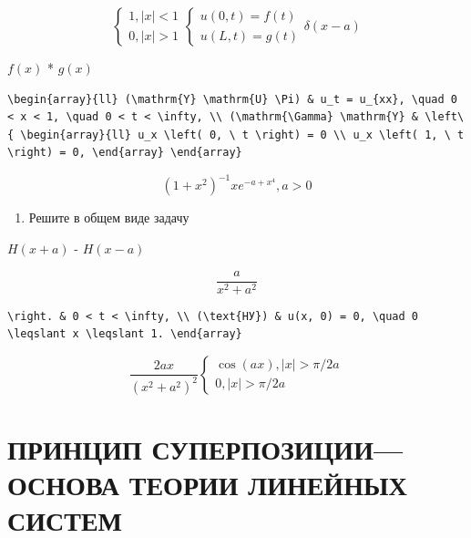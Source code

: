 \documentclass[
  ukrainian,
]{article}
\providecommand{\tightlist}{%
  \setlength{\itemsep}{0pt}\setlength{\parskip}{0pt}}
\begin{document}
\[
\begin{cases} 1, |x| < 1 \\ 0, |x| > 1 \end{cases}
\begin{cases} u(0, t) = f(t) \\ u(L, t) = g(t) \end{cases}
\delta(x-a)
\]

\(f(x)\) * \(g(x)\)

\begin{verbatim}
\begin{array}{ll} (\mathrm{Y} \mathrm{U} \Pi) & u_t = u_{xx}, \quad 0 < x < 1, \quad 0 < t < \infty, \\ (\mathrm{\Gamma} \mathrm{Y} & \left\{ \begin{array}{ll} u_x \left( 0, \ t \right) = 0 \\ u_x \left( 1, \ t \right) = 0, \end{array} \end{array}
\end{verbatim}

\[
(1+x^2)^{-1}
xe^{-a+x^4}, a > 0
\]

\begin{enumerate}
\def\labelenumi{\arabic{enumi}.}
\setcounter{enumi}{1}
\tightlist
\item
  Решите в общем виде задачу
\end{enumerate}

\(H(x+a)\) - \(H(x-a)\)

\[
\frac{a}{x^2+a^2}
\]

\begin{verbatim}
\right. & 0 < t < \infty, \\ (\text{НУ}) & u(x, 0) = 0, \quad 0 \leqslant x \leqslant 1. \end{array}
\end{verbatim}

\[
\frac{2ax}{(x^2+a^2)^2}
\begin{cases} \cos(ax), |x| > \pi/2a \\ 0, |x| > \pi/2a \end{cases}
\]

\section{ПРИНЦИП СУПЕРПОЗИЦИИ--- ОСНОВА ТЕОРИИ ЛИНЕЙНЫХ
СИСТЕМ}\label{ux43fux440ux438ux43dux446ux438ux43f-ux441ux443ux43fux435ux440ux43fux43eux437ux438ux446ux438ux438-ux43eux441ux43dux43eux432ux430-ux442ux435ux43eux440ux438ux438-ux43bux438ux43dux435ux439ux43dux44bux445-ux441ux438ux441ux442ux435ux43c}
\end{document}
